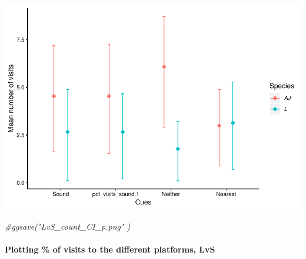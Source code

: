\documentclass[]{article}
\newenvironment{Shaded}{\begin{snugshade}}{\end{snugshade}}
\newcommand{\CommentTok}[1]{\textcolor[rgb]{0.56,0.35,0.01}{\textit{{#1}}}}
\let\oldparagraph\paragraph
\renewcommand{\paragraph}[1]{\oldparagraph{#1}\mbox{}}
\begin{document}
\includegraphics{Sensory_learning_files/figure-latex/unnamed-chunk-20-2.pdf}

\begin{Shaded}
\begin{Highlighting}[]
\CommentTok{#ggsave("LvS_count_CI_p.png" )}
\end{Highlighting}
\end{Shaded}

\paragraph{Plotting \% of visits to the different platforms,
LvS}\label{plotting-of-visits-to-the-different-platforms-lvs}
\end{document}
